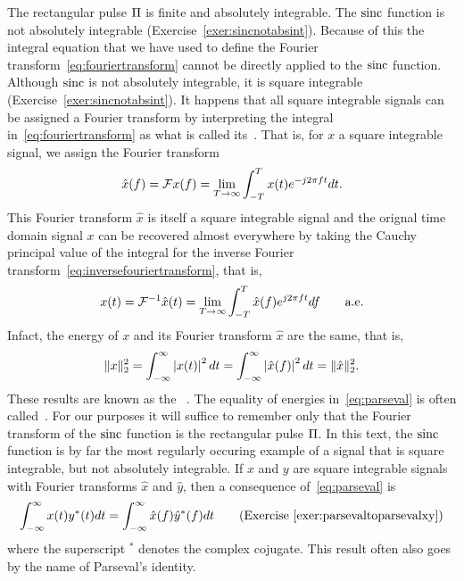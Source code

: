 The rectangular pulse $\Pi$ is finite and absolutely integrable.  The $\operatorname{sinc}$ function is not absolutely integrable (Exercise~\ref{exer:sincnotabsint}). Because of this the integral equation that we have used to define the Fourier transform~\eqref{eq:fouriertransform} cannot be directly applied to the $\operatorname{sinc}$ function.  %
Although $\operatorname{sinc}$ is not absolutely integrable, it is square integrable (Exercise~\ref{exer:sincnotabsint}).  It happens that all square integrable signals can be assigned a Fourier transform by interpreting the integral in~\eqref{eq:fouriertransform} as what is called its~.  That is, for $x$ a square integrable signal, we assign the Fourier transform
\begin{equation}\label{eq:cauchyprinvalint}
\hat{x}(f) = {\mathcal F} x(f) = \lim_{T \to \infty}  \int_{-T}^T x(t) e^{-j2\pi ft} dt.
\end{equation}
This Fourier transform $\hat{x}$ is itself a square integrable signal and the orignal time domain signal $x$ can be recovered almost everywhere by taking the Cauchy principal value of the integral for the inverse Fourier transform~\eqref{eq:inversefouriertransform}, that is,
\[
x(t) = {\mathcal F}^{-1} \hat{x}(t) = \lim_{T \to \infty}  \int_{-T}^T \hat{x}(f) e^{j2\pi f t} df \qquad \text{a.e.}
\]
Infact, the energy of $x$ and its Fourier transform $\hat{x}$ are the same, that is,
\begin{equation}\label{eq:parseval}
\|x\|_2^2 = \int_{-\infty}^{\infty} \left\vert x(t) \right\vert^2 dt = \int_{-\infty}^{\infty} \left\vert \hat{x}(f) \right\vert^2 dt = \|\hat{x}\|_2^2.
\end{equation}
These results are known as the ~\cite[Th.~9.13]{Rudin_real_and_complex_analysis}.  The equality of energies in~\eqref{eq:parseval} is often called~.  For our purposes it will suffice to remember only that the Fourier transform of the $\operatorname{sinc}$ function is the rectangular pulse $\Pi$.  In this text, the $\operatorname{sinc}$ function is by far the most regularly occuring example of a signal that is square integrable, but not absolutely integrable.  
If $x$ and $y$ are square integrable signals with Fourier transforms $\hat{x}$ and $\hat{y}$, then a consequence of~\eqref{eq:parseval} is
\begin{equation} \label{eq:parsevalxy}
\int_{-\infty}^{\infty} x(t)y^*(t) dt = \int_{-\infty}^{\infty} \hat{x}(f)\hat{y}^*(f) dt \qquad \text{(Exercise~\ref{exer:parsevaltoparsevalxy})}
\end{equation}
where the superscript $^*$ denotes the complex cojugate. This result often also goes by the name of Parseval's identity.

